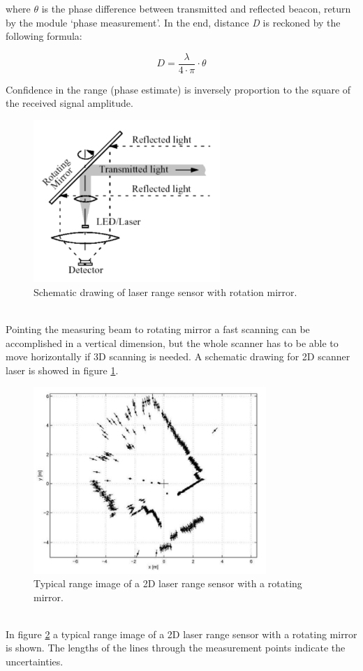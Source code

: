where \textit{$\theta$} is the phase difference between transmitted
and reflected beacon, return by the module `phase measurement'.
In the end, distance \textit{D} is reckoned by the following formula:

\[
D = \frac{\lambda}{4\cdot\pi}\cdot{\theta}
\]

Confidence in the range (phase estimate) is inversely proportion to
the square of the received signal amplitude.
\begin{figure} [h]
  \begin{center}
    \includegraphics[width=200pt]{img/laser_rotation.png}
    \caption{Schematic drawing of laser range sensor with
      rotation mirror.}
    \label{fig:laser_rotation}
  \end{center}
\end{figure}
\\
Pointing the measuring beam
to rotating mirror a fast scanning can be accomplished in a vertical
dimension, but the whole scanner has to be able to move horizontally
if 3D scanning is needed. A schematic drawing for 2D scanner laser
is showed in figure \ref{fig:laser_rotation}.
\begin{figure} [!h]
  \begin{center}
    \includegraphics[width=250pt]{img/laser_scan_map.png}
    \caption{Typical range image of a 2D laser range sensor with a
      rotating mirror.}
    \label{fig:laser_scan_map}
  \end{center}
\end{figure}
\\
In figure \ref{fig:laser_scan_map} a typical range image of a 2D
laser range sensor with
a rotating mirror is shown. The lengths of the lines through the
measurement points indicate the uncertainties.


